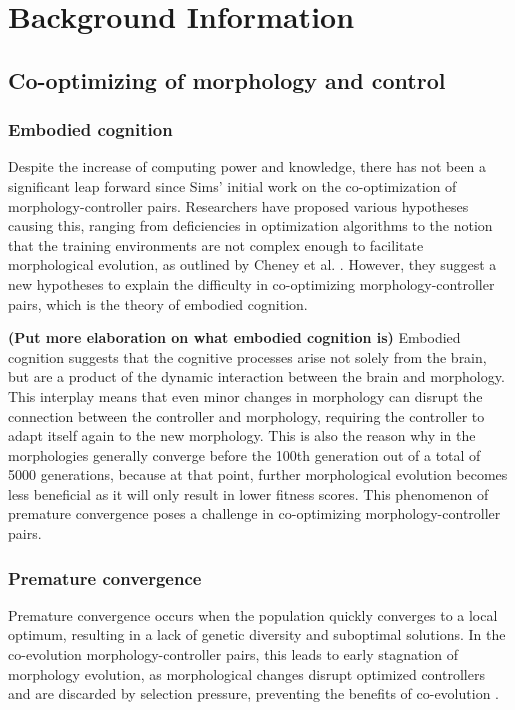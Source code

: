 \section{Background Information}

\subsection{Co-optimizing of morphology and control}
    \subsubsection{Embodied cognition}
        Despite the increase of computing power and knowledge, there has not been a significant leap forward since Sims' initial work on the co-optimization of morphology-controller pairs. Researchers have proposed various hypotheses causing this, ranging from deficiencies in optimization algorithms to the notion that the training environments are not complex enough to facilitate morphological evolution, as outlined by Cheney et al. \cite{Cheney_2016}. However, they suggest a new hypotheses to explain the difficulty in co-optimizing morphology-controller pairs, which is the theory of embodied cognition. 

        \textbf{(Put more elaboration on what embodied cognition is)} Embodied cognition suggests that the cognitive processes arise not solely from the brain, but are a product of the dynamic interaction between the brain and morphology. This interplay means that even minor changes in morphology can disrupt the connection between the controller and morphology, requiring the controller to adapt itself again to the new morphology. This is also the reason why in \cite{Cheney_2016} the morphologies generally converge before the 100th generation out of a total of 5000 generations, because at that point, further morphological evolution becomes less beneficial as it will only result in lower fitness scores. This phenomenon of premature convergence poses a challenge in co-optimizing morphology-controller pairs.
 
    \subsubsection{Premature convergence}
        Premature convergence occurs when the population quickly converges to a local optimum, resulting in a lack of genetic diversity and suboptimal solutions. In the co-evolution morphology-controller pairs, this leads to early stagnation of morphology evolution, as morphological changes disrupt optimized controllers and are discarded by selection pressure, preventing the benefits of co-evolution \cite{Luis_2024}.
        
